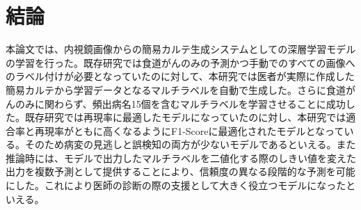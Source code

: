 \section{結論}
本論文では、内視鏡画像からの簡易カルテ生成システムとしての深層学習モデルの学習を行った。既存研究では食道がんのみの予測かつ手動でのすべての画像へのラベル付けが必要となっていたのに対して、本研究では医者が実際に作成した簡易カルテから学習データとなるマルチラベルを自動で生成した。さらに食道がんのみに関わらず、頻出病名15個を含むマルチラベルを学習させることに成功した。既存研究では再現率に最適したモデルになっていたのに対し、本研究では適合率と再現率がともに高くなるようにF1-Scoreに最適化されたモデルとなっている。そのため病変の見逃しと誤検知の両方が少ないモデルであるといえる。また推論時には、モデルで出力したマルチラベルを二値化する際のしきい値を変えた出力を複数予測として提供することにより、信頼度の異なる段階的な予測を可能にした。これにより医師の診断の際の支援として大きく役立つモデルになったといえる。
